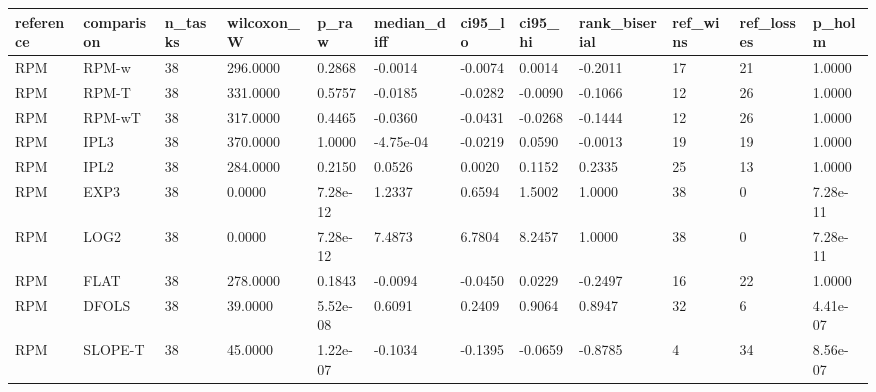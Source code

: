 \begin{tabular}{llllllllllll}
\hline
reference & comparison & n\_tasks & wilcoxon\_W & p\_raw & median\_diff & ci95\_lo & ci95\_hi & rank\_biserial & ref\_wins & ref\_losses & p\_holm \\
\hline
RPM & RPM-w & 38 & 296.0000 & 0.2868 & -0.0014 & -0.0074 & 0.0014 & -0.2011 & 17 & 21 & 1.0000 \\
RPM & RPM-T & 38 & 331.0000 & 0.5757 & -0.0185 & -0.0282 & -0.0090 & -0.1066 & 12 & 26 & 1.0000 \\
RPM & RPM-wT & 38 & 317.0000 & 0.4465 & -0.0360 & -0.0431 & -0.0268 & -0.1444 & 12 & 26 & 1.0000 \\
RPM & IPL3 & 38 & 370.0000 & 1.0000 & -4.75e-04 & -0.0219 & 0.0590 & -0.0013 & 19 & 19 & 1.0000 \\
RPM & IPL2 & 38 & 284.0000 & 0.2150 & 0.0526 & 0.0020 & 0.1152 & 0.2335 & 25 & 13 & 1.0000 \\
RPM & EXP3 & 38 & 0.0000 & 7.28e-12 & 1.2337 & 0.6594 & 1.5002 & 1.0000 & 38 & 0 & 7.28e-11 \\
RPM & LOG2 & 38 & 0.0000 & 7.28e-12 & 7.4873 & 6.7804 & 8.2457 & 1.0000 & 38 & 0 & 7.28e-11 \\
RPM & FLAT & 38 & 278.0000 & 0.1843 & -0.0094 & -0.0450 & 0.0229 & -0.2497 & 16 & 22 & 1.0000 \\
RPM & DFOLS & 38 & 39.0000 & 5.52e-08 & 0.6091 & 0.2409 & 0.9064 & 0.8947 & 32 & 6 & 4.41e-07 \\
RPM & SLOPE-T & 38 & 45.0000 & 1.22e-07 & -0.1034 & -0.1395 & -0.0659 & -0.8785 & 4 & 34 & 8.56e-07 \\
\hline
\end{tabular}
